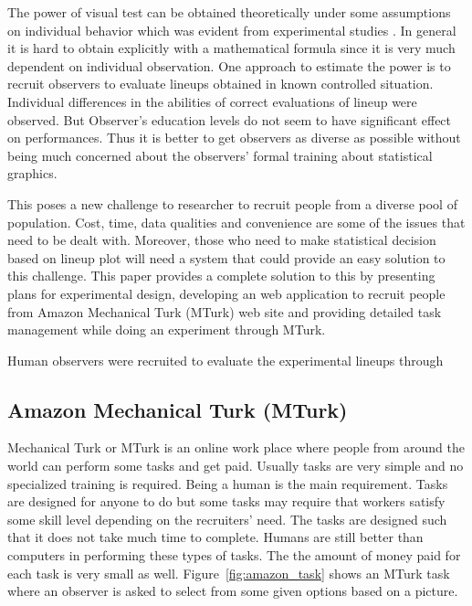 \documentclass[11pt]{article}
\begin{document}
The power of visual test can be obtained theoretically under some assumptions on individual behavior which was evident from experimental studies \citep{majumder:2013}. In general it is hard to obtain explicitly with a mathematical formula since it is very much dependent on individual observation. One approach to estimate the power is to recruit observers to evaluate lineups obtained in known controlled situation. Individual differences in the abilities of correct evaluations of lineup were observed. But Observer's education levels do not seem to have significant effect on performances. Thus it is better to get observers as diverse as possible without being much concerned about the observers' formal training about statistical graphics.

This poses a new challenge to researcher to recruit people from a diverse pool of population. Cost, time, data qualities and convenience are some of the issues that need to be dealt with. Moreover, those who need to make statistical decision based on lineup plot will need a system that could provide an easy solution to this challenge.  This paper provides a complete solution to this by presenting plans for experimental design, developing an web application to recruit people from Amazon Mechanical Turk (MTurk) web site and providing detailed task management while doing an experiment through MTurk.  

Human observers were recruited to evaluate the experimental lineups through 

\subsection{Amazon Mechanical Turk (MTurk)}

\cite{turk} Mechanical Turk  or MTurk is an online work place where people from around the world can perform some tasks and get paid. Usually tasks are very simple and no specialized training is required. Being a human is the main requirement. Tasks are designed for anyone to do but some tasks may require that workers satisfy some skill level depending on the recruiters' need. The tasks are designed such that it does not take much time to complete. Humans are still better than computers in performing these types of tasks. The the amount of money paid for each task is very small as well. Figure~\ref{fig:amazon_task} shows an MTurk task where an observer is asked to select from some given options based on a picture. 
\end{document}
